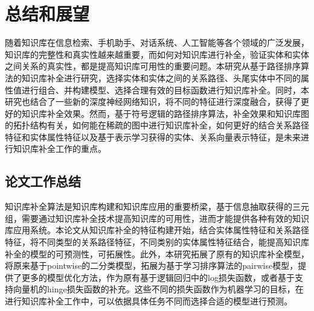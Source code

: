 
\chapter{总结和展望}
\label{cha:kbc-summary}
随着知识库在信息检索、手机助手、对话系统、人工智能等各个领域的广泛发展，知识库的完整性和真实性越来越重要，而如何对知识库进行补全，验证实体和实体之间关系的真实性，都是提高知识库可用性的重要问题。本研究从基于路径排序算法的知识库补全进行研究，选择实体和实体之间的关系路径、头尾实体中不同的属性值进行组合、并构建模型、选择合理有效的目标函数进行知识库补全。同时，本研究也结合了一些新的深度神经网络知识，将不同的特征进行深度融合，获得了更好的知识库补全效果。然而，基于符号逻辑的路径排序算法，补全效果和知识库图的拓扑结构有关，如何能在稀疏的图中进行知识库补全，如何更好的结合关系路径特征和实体属性特征以及基于表示学习获得的实体、关系向量表示特征，是未来进行知识库补全工作的重点。

\section{论文工作总结}
知识库补全算法是知识库构建和知识库应用的重要桥梁，基于信息抽取获得的三元组，需要通过知识库补全技术提高知识库的可用性，进而才能提供各种有效的知识库应用系统。本论文从知识库补全的特征构建开始，结合实体属性特征和关系路径特征，将不同类型的关系路径特征，不同类别的实体属性特征结合，能提高知识库补全的模型的可预测性，可拓展性。此外，本研究拓展了原有的知识库补全模型，将原来基于pointwise的二分类模型，拓展为基于学习排序算法的pairwise模型，提供了更多的模型优化方法，作为原有基于逻辑回归中的log损失函数，或者基于支持向量机的hinge损失函数的补充。这些不同的损失函数作为机器学习的目标，在进行知识库补全工作中，可以依据具体任务不同而选择合适的模型进行预测。

